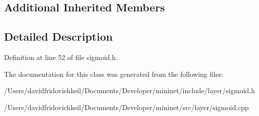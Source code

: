 \subsection*{Additional Inherited Members}


\subsection{Detailed Description}


Definition at line 52 of file sigmoid.\+h.



The documentation for this class was generated from the following files\+:\begin{DoxyCompactItemize}
\item 
/\+Users/davidfridovichkeil/\+Documents/\+Developer/mininet/include/layer/sigmoid.\+h\item 
/\+Users/davidfridovichkeil/\+Documents/\+Developer/mininet/src/layer/sigmoid.\+cpp\end{DoxyCompactItemize}
